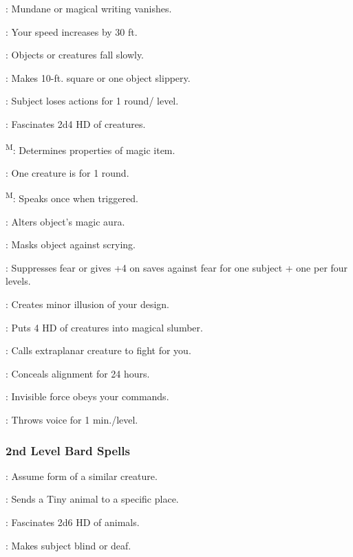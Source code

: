 : Mundane or magical writing vanishes.

: Your speed increases by 30 ft.

: Objects or creatures fall slowly.

: Makes 10-ft. square or one object slippery.

: Subject loses actions for 1 round/ level.

: Fascinates 2d4 HD of creatures.

\textsuperscript{M}: Determines properties of magic item.

: One creature is  for 1 round.

\textsuperscript{M}: Speaks once when triggered.

: Alters object's magic aura.

: Masks object against scrying.

: Suppresses fear or gives +4 on saves against fear for one subject + one per four levels.

: Creates minor illusion of your design.

: Puts 4 HD of creatures into magical slumber.

: Calls extraplanar creature to fight for you.

: Conceals alignment for 24 hours.

: Invisible force obeys your commands.

: Throws voice for 1 min./level.

\subsubsection{2nd Level Bard Spells}

: Assume form of a similar creature.

: Sends a Tiny animal to a specific place.

: Fascinates 2d6 HD of animals.

: Makes subject blind or deaf.

